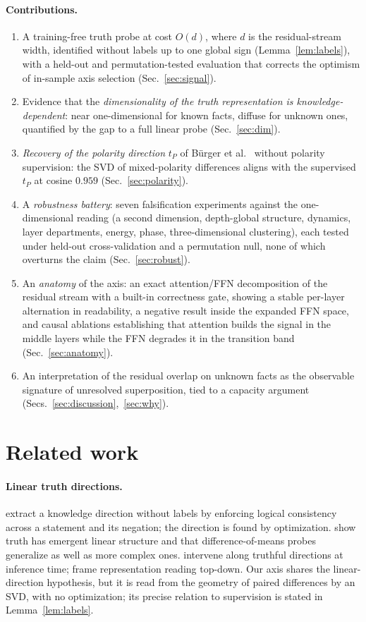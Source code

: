 \documentclass[11pt]{article}
\begin{document}
\paragraph{Contributions.}
\begin{enumerate}
\item A training-free truth probe at cost $O(d)$, where $d$ is the
residual-stream width, identified without labels up to one global sign
(Lemma~\ref{lem:labels}), with a held-out and permutation-tested evaluation
that corrects the optimism of in-sample axis selection
(Sec.~\ref{sec:signal}).
\item Evidence that the \emph{dimensionality of the truth representation is
knowledge-dependent}: near one-dimensional for known facts, diffuse for
unknown ones, quantified by the gap to a full linear probe
(Sec.~\ref{sec:dim}).
\item \emph{Recovery of the polarity direction} $t_P$ of B\"urger et
al.~\cite{burger2024} without polarity supervision: the SVD of mixed-polarity
differences aligns with the supervised $t_P$ at cosine $0.959$
(Sec.~\ref{sec:polarity}).
\item A \emph{robustness battery}: seven falsification experiments against the
one-dimensional reading (a second dimension, depth-global structure, dynamics,
layer departments, energy, phase, three-dimensional clustering), each tested
under held-out cross-validation and a permutation null, none of which
overturns the claim (Sec.~\ref{sec:robust}).
\item An \emph{anatomy} of the axis: an exact attention/FFN decomposition of
the residual stream with a built-in correctness gate, showing a stable
per-layer alternation in readability, a negative result inside the expanded
FFN space, and causal ablations establishing that attention builds the signal
in the middle layers while the FFN degrades it in the transition band
(Sec.~\ref{sec:anatomy}).
\item An interpretation of the residual overlap on unknown facts as the
observable signature of unresolved superposition, tied to a capacity argument
(Secs.~\ref{sec:discussion},~\ref{sec:why}).
\end{enumerate}

\section{Related work}

\paragraph{Linear truth directions.} \cite{burns2023} extract a knowledge
direction without labels by enforcing logical consistency across a statement
and its negation; the direction is found by optimization. \cite{marks2024}
show truth has emergent linear structure and that difference-of-means probes
generalize as well as more complex ones. \cite{li2023} intervene along
truthful directions at inference time; \cite{zou2023} frame representation
reading top-down. Our axis shares the linear-direction hypothesis, but it is
read from the geometry of paired differences by an SVD, with no optimization;
its precise relation to supervision is stated in Lemma~\ref{lem:labels}.
\end{document}
